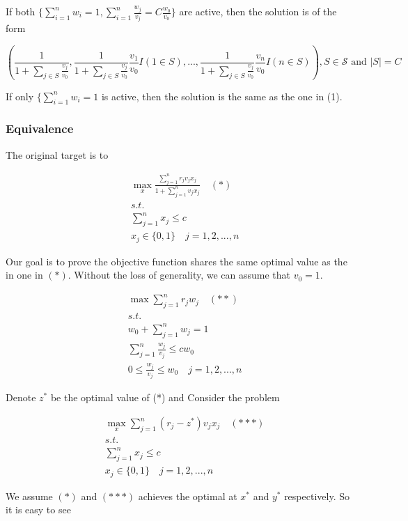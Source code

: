 \documentclass[11pt]{article}
\begin{document}
If both
\(\{\sum_{i=1}^n w_i=1, \sum_{i=1}^n \frac{w_j}{v_j}=C\frac{w_0}{v_0}\}\)
are active, then the solution is of the form

\[
(\frac{1}{1+\sum_{j\in S}\frac{v_j}{v_0}}, \frac{1}{1+\sum_{j\in S}\frac{v_j}{v_0}}\frac{v_1}{v_0}I(1\in S), ..., \frac{1}{1+\sum_{j\in S}\frac{v_j}{v_0}}\frac{v_n}{v_0}I(n\in S)), S \in \mathcal{S} \text{ and } |S|=C
\]

If only \(\{\sum_{i=1}^n w_i=1\) is active, then the solution is the
same as the one in (1).

\hypertarget{equivalence}{%
\subsubsection{Equivalence}\label{equivalence}}

The original target is to

\[
\begin{align}
& \max_x \frac{\sum_{j=1}^n r_jv_jx_j}{1 + \sum_{j=1}^n v_jx_j}\quad(*) \\
& s.t. \\
& \sum_{j=1}^n x_j\leq c\\
& x_j \in \{0, 1\} \quad j=1,2,...,n
\end{align}
\]

Our goal is to prove the objective function shares the same optimal
value as the in one in \((*)\). Without the loss of generality, we can
assume that \(v_0=1\).

\[
\begin{align}
& \max \sum_{j=1}^nr_jw_j \quad(**)\\
& s.t. \\
& w_0 + \sum_{j=1}^n w_j=1\\
& \sum_{j=1}^n \frac{w_j}{v_j} \leq c w_0\\
& 0  \leq \frac{w_j}{v_j} \leq w_0\quad j=1,2,...,n
\end{align}
\]

Denote \(z^*\) be the optimal value of (*) and Consider the problem

\[
\begin{align}
& \max_x \sum_{j=1}^n (r_j-z^*)v_jx_j\quad(***) \\
& s.t. \\
& \sum_{j=1}^n x_j\leq c\\
& x_j \in \{0, 1\} \quad j=1,2,...,n
\end{align}
\]

We assume \((*)\) and \((***)\) achieves the optimal at \(x^*\) and
\(y^*\) respectively. So it is easy to see
\end{document}

